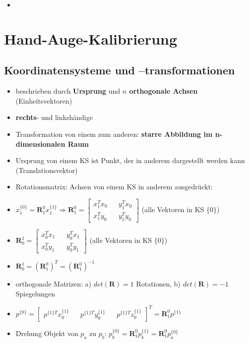 \documentclass[11pt]{article}
\begin{document}
\begin{itemize}
    \item 
\end{itemize}


\section{Hand-Auge-Kalibrierung}

\subsection{Koordinatensysteme und –transformationen}

\begin{itemize}
    \item beschrieben durch \textbf{Ursprung} und \textbf{$n$ orthogonale Achsen} (Einheitsvektoren)
    \item \textbf{rechts}- und linkshändige
    \item Transformation von einem zum anderen: \textbf{starre Abbildung im n-dimensionalen Raum}
    \item Ursprung von einem KS ist Punkt, der in anderem dargestellt werden kann (Translationsvektor)
    \item Rotationsmatrix: Achsen von einem KS in anderem ausgedrückt: 
    \item $x_1^{\{0\}} = \boldsymbol{R}_1^0 x_1^{\{1\}} \Rightarrow \boldsymbol{R}_1^0 = \begin{bmatrix} x_1^T x_0 && y_1^T x_0 \\ x_1^T y_0 && y_1^T y_0 \end{bmatrix}$ (alle Vektoren in KS $\{0\}$)
    \item $\boldsymbol{R}_0^1 = \begin{bmatrix} x_0^T x_1 && y_0^T x_1 \\ x_0^T y_1 && y_0^T y_1 \end{bmatrix}$ (alle Vektoren in KS $\{0\}$)
    \item $\boldsymbol{R}_0^1 = (\boldsymbol{R}_1^0)^T = (\boldsymbol{R}_1^0)^{-1}$
    \item orthogonale Matrizen: a) $det(\boldsymbol{R}) = 1$ Rotationen, b) $det(\boldsymbol{R}) = -1$ Spiegelungen
    \item $p^{\{0\}} = \begin{bmatrix} p^{\{1\}T} x_0^{\{1\}} && p^{\{1\}T} y_0^{\{1\}} && p^{\{1\}T} z_0^{\{1\}} \end{bmatrix}^T = \boldsymbol{R}_1^0 p^{\{1\}}$
    \item Drehung Objekt von $p_a$ zu $p_b$: $p_b^{\{0\}} = \boldsymbol{R}_1^0 p_b^{\{1\}} = \boldsymbol{R}_1^0 p_a^{\{0\}}$

\end{itemize}
\end{document}
